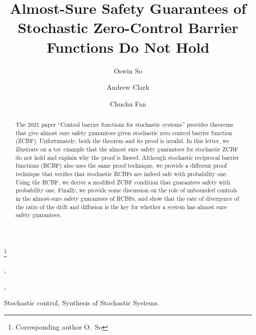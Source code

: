 \documentclass[twocolumn,amsthm]{autart}
\begin{document}
\begin{frontmatter}

\title{Almost-Sure Safety Guarantees of Stochastic Zero-Control Barrier Functions Do Not Hold} 

\thanks[footnoteinfo]{Corresponding author O.~So}

\author[MIT]{Oswin So},    \author[WashU]{Andrew Clark},               \author[MIT]{Chuchu Fan}  

\address[MIT]{Massachusetts Institute of Technology, United States}  \address[WashU]{Washington University in St. Louis, United States}             

\begin{keyword}                                         
Stochastic control, Synthesis of Stochastic Systems.
\end{keyword}

\begin{abstract}                          The 2021 paper ``Control barrier functions for stochastic systems'' provides theorems that give almost sure safety guarantees given stochastic zero control barrier function (ZCBF). Unfortunately, both the theorem and its proof is invalid. In this letter, we illustrate on a toy example that the almost sure safety guarantees for stochastic ZCBF do not hold and explain why the proof is flawed.
Although stochastic reciprocal barrier functions (RCBF) also uses the same proof technique, we provide a different proof technique that verifies that stochastic RCBFs are indeed safe with probability one.
Using the RCBF, we derive a modified ZCBF condition that guarantees safety with probability one.
Finally, we provide some discussion on the role of unbounded controls in the almost-sure safety guarantees of RCBFs, and show that the rate of divergence of the ratio of the drift and diffusion is the key for whether a system has almost sure safety guarantees.

\end{abstract}

\end{frontmatter}
\endNoHyper
\end{document}
